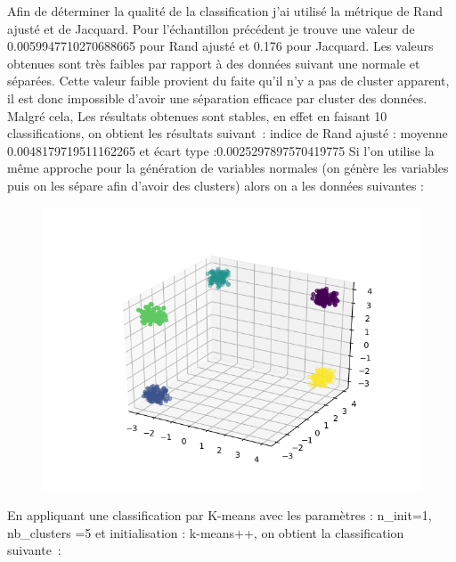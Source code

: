 \documentclass[12pt]{scrartcl} %
\begin{document}
\newline
Afin de déterminer la qualité de la classification j'ai utilisé la métrique de Rand ajusté et de Jacquard. Pour l'échantillon précédent je trouve une valeur de 0.0059947710270688665 pour Rand ajusté et 0.176 pour Jacquard. Les valeurs obtenues sont très faibles par rapport à des données suivant une normale et séparées. Cette valeur faible provient du faite qu'il n'y a pas de cluster apparent, il est donc impossible d'avoir une séparation efficace par cluster des données. Malgré cela, Les résultats obtenues sont stables, en effet en faisant 10 classifications, on obtient les résultats suivant~: indice de Rand ajusté : moyenne 0.0048179719511162265 et écart type :0.0025297897570419775
\newline
Si l'on utilise la même approche pour la génération de variables normales (on génère les variables puis on les sépare afin d'avoir des clusters) alors on a les données suivantes :
\newline
\begin{figure}[!h]
 \centering 
\includegraphics[scale=.3]{unifor_lag.png}
\end{figure}
\newline
En appliquant une classification par K-means avec les paramètres : n\_init=1, nb\_clusters =5 et initialisation : k-means++, on obtient la classification suivante~:
\newline
\end{document}
